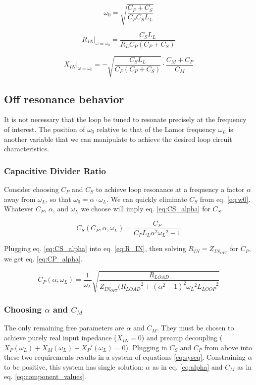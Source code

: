 \begin{equation} \label{eq:w0}
    \omega_0 = \sqrt{\frac{C_P+C_S}{C_P C_S L_L}}
\end{equation}

\begin{equation} \label{eq:R_IN_RES}
    R_{IN}\big|_{\omega=\omega_0}= \frac{C_S L_L}{R_L C_P (C_P + C_S)}
\end{equation}

\begin{equation} \label{eq:X_IN_RES}
    X_{IN}\big|_{\omega=\omega_0}=-\sqrt{\frac{C_S L_L}{C_P (C_P + C_S)}} \cdot \frac{C_M + C_P}{C_M}
\end{equation}

\subsection{Off resonance behavior}
It is not necessary that the loop be tuned to resonate precisely at the frequency of interest. The position of
$\omega_0$ relative to that of the Lamor frequency $\omega_L$ is another variable that we can manipulate to achieve the
desired loop circuit characteristics.

\subsubsection{Capacitive Divider Ratio}
Consider choosing $C_P$ and $C_S$ to achieve loop resonance at a frequency a factor $\alpha$ away from $\omega_L$, so
that $\omega_0 = \alpha\cdot\omega_L$. We can quickly eliminate $C_S$ from eq. \ref{eq:w0}. Whatever $C_P$, $\alpha$, and
$\omega_L$ we choose will imply eq. \ref{eq:CS_alpha} for $C_S$.

\begin{equation} \label{eq:CS_alpha}
    C_S(C_P,\alpha,\omega_L) = \frac{C_P}{C_P L_L \alpha^2 {\omega_L}^2 -1}
\end{equation}

Plugging eq. \ref{eq:CS_alpha} into eq. \ref{eq:R_IN}, then solving $R_{IN} = Z_{IN_{OPT}}$ for $C_P$, we get eq.
\ref{eq:CP_alpha}.

\begin{equation} \label{eq:CP_alpha}
    C_P(\alpha,\omega_L) = \frac{1}{\omega_L}\sqrt{\frac{R_{LOAD}}{Z_{IN_{OPT}} ( {R_{LOAD}}^2 + (\alpha^2-1)^2 {\omega_L}^2
    {L_{LOOP}}^2}}
\end{equation}

\subsubsection{Choosing $\alpha$ and $C_M$}
The only remaining free parameters are $\alpha$ and $C_M$.  They must be chosen to achieve purely real input inpedance
($X_{IN} = 0$) and preamp decoupling ($X_P(\omega_L) + X_M(\omega_L) +{X_P}'(\omega_L) = 0$). Plugging in $C_S$ and
$C_P$ from above into these two requirements results in a system of equations \ref{eq:syseq}. Constraining $\alpha$ to
be positive, this system has single solution: $\alpha$ as in eq. \ref{eq:alpha} and $C_M$ as in eq.
\ref{eq:component_values}.

